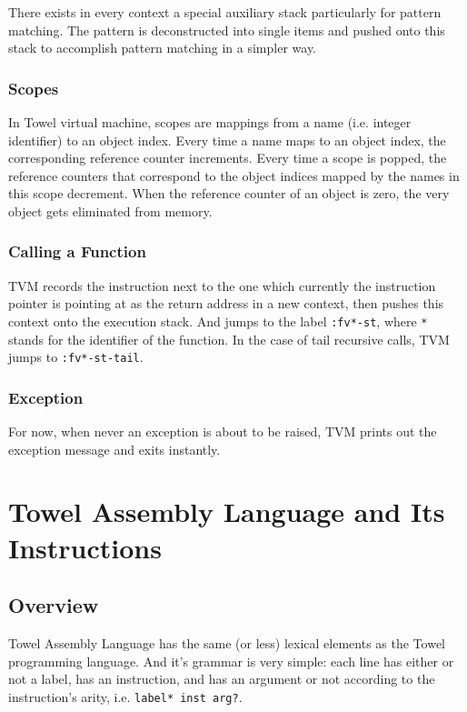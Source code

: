 \documentclass{article}
\begin{document}
There exists in every context a special auxiliary stack particularly for pattern matching. The pattern is deconstructed into single items and pushed onto this stack to accomplish pattern matching in a simpler way.

\subsubsection{Scopes}

In Towel virtual machine, scopes are mappings from a name (i.e. integer identifier) to an object index. Every time a name maps to an object index, the corresponding reference counter increments. Every time a scope is popped, the reference counters that correspond to the object indices mapped by the names in this scope decrement. When the reference counter of an object is zero, the very object gets eliminated from memory.

\subsubsection{Calling a Function}

TVM records the instruction next to the one which currently the instruction pointer is pointing at as the return address in a new context, then pushes this context onto the execution stack. And jumps to the label \texttt{:fv*-st}, where \texttt{*} stands for the identifier of the function. In the case of tail recursive calls, TVM jumps to \texttt{:fv*-st-tail}.

\subsubsection{Exception}

For now, when never an exception is about to be raised, TVM prints out the exception message and exits instantly.

\section{Towel Assembly Language and Its Instructions}

\subsection{Overview}

Towel Assembly Language has the same (or less) lexical elements as the Towel programming language. And it's grammar is very simple: each line has either or not a label, has an instruction, and has an argument or not according to the instruction's arity, i.e. \texttt{label* inst arg?}.
\end{document}
